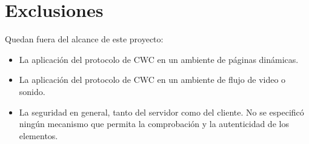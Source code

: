 
\section{Exclusiones}
Quedan fuera del alcance de este proyecto:

\begin{itemize}
\item La aplicación del protocolo de CWC en un ambiente de páginas dinámicas.
\item La aplicación del protocolo de CWC en un ambiente de flujo de video o sonido.
\item La seguridad en general, tanto del servidor como del cliente. No se especificó ningún mecanismo que permita la comprobación y la autenticidad de los elementos.
\end{itemize}


